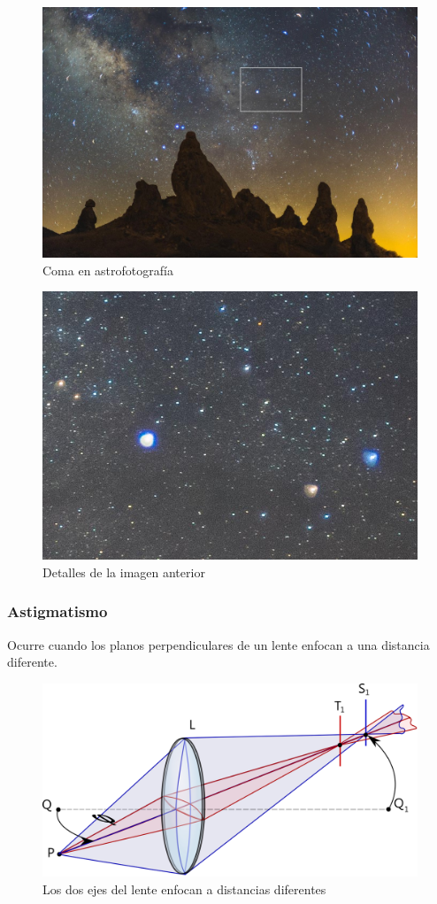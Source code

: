 \documentclass{article}
\begin{document}
\begin{figure}[H]
	\centering
	\includegraphics[width=0.65\linewidth]{Figuras/Coma_3}
	\caption{Coma en astrofotografía}
	\label{fig:coma3}
\end{figure}

\begin{figure}[H]
	\centering
	\includegraphics[width=0.65\linewidth]{Figuras/Coma_4}
	\caption{Detalles de la imagen anterior}
	\label{fig:coma4}
\end{figure}


\subsubsection{Astigmatismo}

Ocurre cuando los planos perpendiculares de un lente enfocan a una distancia diferente.

\begin{figure}[H]
	\centering
	\includegraphics[width=0.65\linewidth]{Figuras/Astigmatismo}
	\caption{Los dos ejes del lente enfocan a distancias diferentes}
	\label{fig:astigmatismo}
\end{figure}
\end{document}

